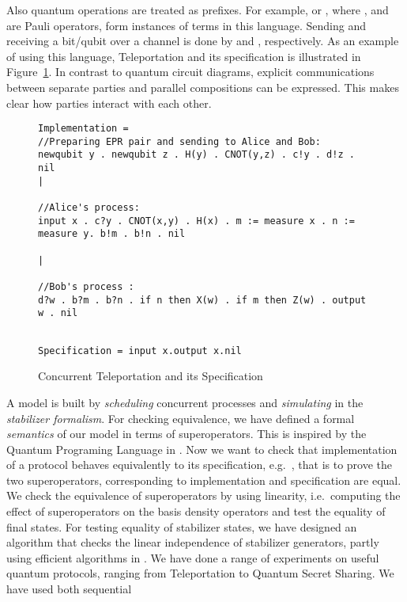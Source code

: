 \documentclass[]{llncs}
\begin{document}
Also quantum operations are treated as prefixes.
For example,  or ,
where , and  are Pauli operators, form instances of terms in this language. 
Sending and receiving a bit/qubit
 over a channel 
 is done by  and , respectively. As an example of using this language, Teleportation and
its specification is illustrated in Figure~\ref{fig:lang}. In contrast to quantum circuit diagrams, explicit communications between separate parties 
and parallel compositions can be expressed. This makes clear how parties interact with each other.
\begin{figure}
\vspace{-5mm}
\begin{Verbatim}[frame=single,fontsize=\scriptsize]
Implementation =
//Preparing EPR pair and sending to Alice and Bob:
newqubit y . newqubit z . H(y) . CNOT(y,z) . c!y . d!z . nil
|

//Alice's process:
input x . c?y . CNOT(x,y) . H(x) . m := measure x . n := measure y. b!m . b!n . nil

|

//Bob's process :
d?w . b?m . b?n . if n then X(w) . if m then Z(w) . output w . nil
\end{Verbatim}
\begin{Verbatim}[frame=single,fontsize=\scriptsize]

Specification = input x.output x.nil
\end{Verbatim}
\vspace{-5mm}
\caption{Concurrent Teleportation and its Specification}
\label{fig:lang}
\end{figure}
A model is built by \emph{scheduling} concurrent processes and \emph{simulating} in the \emph{stabilizer formalism}.
For checking equivalence, we have defined a formal \emph{semantics} of our model in terms of superoperators. This is inspired by the 
Quantum Programing Language in \cite{qpl}. 
Now we want to check that implementation of a protocol behaves equivalently to its specification, 
e.g.\, , that is to prove the two 
superoperators, corresponding to implementation and specification are equal.
We check the equivalence of superoperators by using linearity, i.e.\ computing the effect of superoperators on 
the basis density operators and test the equality of final states.    
For testing equality of stabilizer states, we have designed an algorithm that checks
the linear independence of stabilizer generators, partly using efficient algorithms in \cite{aden}.
We have done a range of experiments on useful quantum protocols, ranging from Teleportation to Quantum Secret Sharing. We have used both sequential
\end{document}
